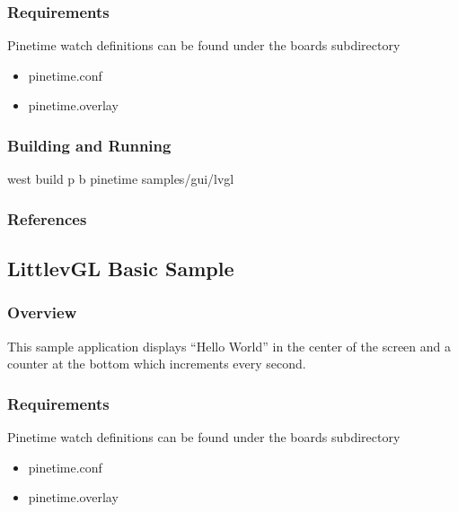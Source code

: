 \documentclass[letterpaper,10pt,english]{sphinxmanual}
\begin{document}
\subsubsection{Requirements}
\label{\detokenize{samples/gui/lvaccel/README:requirements}}
Pinetime watch
definitions can be found under the boards sub\sphinxhyphen{}directory
\begin{itemize}
\item {} 
pinetime.conf

\item {} 
pinetime.overlay

\end{itemize}


\subsubsection{Building and Running}
\label{\detokenize{samples/gui/lvaccel/README:building-and-running}}
west build \sphinxhyphen{}p \sphinxhyphen{}b pinetime samples/gui/lvgl


\subsubsection{References}
\label{\detokenize{samples/gui/lvaccel/README:references}}

\subsection{LittlevGL Basic Sample}
\label{\detokenize{samples/gui/lvgl/README:littlevgl-basic-sample}}\label{\detokenize{samples/gui/lvgl/README:lvgl-sample}}\label{\detokenize{samples/gui/lvgl/README::doc}}

\subsubsection{Overview}
\label{\detokenize{samples/gui/lvgl/README:overview}}
This sample application displays “Hello World” in the center of the screen
and a counter at the bottom which increments every second.


\subsubsection{Requirements}
\label{\detokenize{samples/gui/lvgl/README:requirements}}
Pinetime watch
definitions can be found under the boards sub\sphinxhyphen{}directory
\begin{itemize}
\item {} 
pinetime.conf

\item {} 
pinetime.overlay

\end{itemize}
\end{document}
